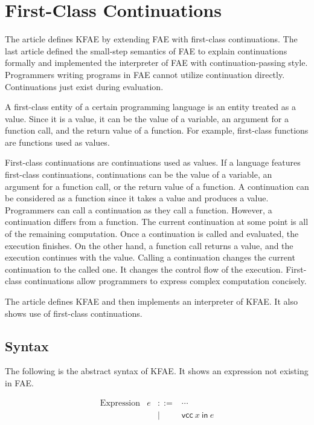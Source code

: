 \setchapterpreamble[u]{\margintoc}
\chapter{First-Class Continuations}

The article defines KFAE by extending FAE with first-class continuations. The
last article defined the small-step semantics of FAE to explain continuations
formally and implemented the interpreter of FAE with continuation-passing style.
Programmers writing programs in FAE cannot utilize continuation directly.
Continuations just exist during evaluation.

A first-class entity of a certain programming language is an entity treated as a
value. Since it is a value, it can be the value of a variable, an argument for a
function call, and the return value of a function. For example, first-class
functions are functions used as values.

First-class continuations are continuations used as values. If a language
features first-class continuations, continuations can be the value of a variable,
an argument for a function call, or the return value of a function. A
continuation can be considered as a function since it takes a value and produces
a value. Programmers can call a continuation as they call a function. However, a
continuation differs from a function. The current continuation at some point is
all of the remaining computation. Once a continuation is called and evaluated,
the execution finishes. On the other hand, a function call returns a value, and
the execution continues with the value. Calling a continuation changes the
current continuation to the called one. It changes the control flow of the
execution. First-class continuations allow programmers to express complex
computation concisely.

The article defines KFAE and then implements an interpreter of KFAE. It also
shows use of first-class continuations.

\section{Syntax}

The following is the abstract syntax of KFAE. It shows an expression not existing
in FAE.

\[
\begin{array}{lrcl}
\text{Expression} & e & ::= & \cdots \\
&& | & \textsf{vcc}\ x\ \textsf{in}\ e \\
\end{array}
\]

